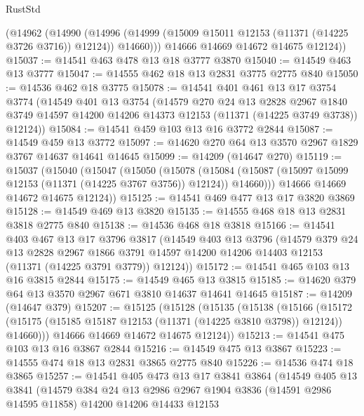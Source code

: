 \begin{lexlean}{RustStd}
\begin{coremodule}
        (@14962
          (@14990
            (@14996 (@14999 (@15009 @15011 @12153 (@11371 (@14225 @3726 @3716)) @12124)) @14660)))
        @14666
        @14669
        @14672
        @14675
        @12124))
@15037 := @14541 @463 @478 @13 @18 @3777 @3870
@15040 := @14549 @463 @13 @3777
@15047 := @14555 @462 @18 @13 @2831 @3775 @2775 @840
@15050 := @14536 @462 @18 @3775
@15078 := @14541
    @401
    @461
    @13
    @17
    @3754
    @3774
    (@14549
      @401
      @13
      @3754
      (@14579
        @270
        @24
        @13
        @2828
        @2967
        @1840
        @3749
        @14597
        @14200
        @14206
        @14373
        @12153
        (@11371 (@14225 @3749 @3738))
        @12124))
@15084 := @14541 @459 @103 @13 @16 @3772 @2844
@15087 := @14549 @459 @13 @3772
@15097 := @14620 @270 @64 @13 @3570 @2967 @1829 @3767 @14637 @14641 @14645
@15099 := @14209 (@14647 @270)
@15119 := @15037
    (@15040
      (@15047
        (@15050
          (@15078
            (@15084 (@15087 (@15097 @15099 @12153 (@11371 (@14225 @3767 @3756)) @12124)) @14660)))
        @14666
        @14669
        @14672
        @14675
        @12124))
@15125 := @14541 @469 @477 @13 @17 @3820 @3869
@15128 := @14549 @469 @13 @3820
@15135 := @14555 @468 @18 @13 @2831 @3818 @2775 @840
@15138 := @14536 @468 @18 @3818
@15166 := @14541
    @403
    @467
    @13
    @17
    @3796
    @3817
    (@14549
      @403
      @13
      @3796
      (@14579
        @379
        @24
        @13
        @2828
        @2967
        @1866
        @3791
        @14597
        @14200
        @14206
        @14403
        @12153
        (@11371 (@14225 @3791 @3779))
        @12124))
@15172 := @14541 @465 @103 @13 @16 @3815 @2844
@15175 := @14549 @465 @13 @3815
@15185 := @14620 @379 @64 @13 @3570 @2967 @671 @3810 @14637 @14641 @14645
@15187 := @14209 (@14647 @379)
@15207 := @15125
    (@15128
      (@15135
        (@15138
          (@15166
            (@15172 (@15175 (@15185 @15187 @12153 (@11371 (@14225 @3810 @3798)) @12124)) @14660)))
        @14666
        @14669
        @14672
        @14675
        @12124))
@15213 := @14541 @475 @103 @13 @16 @3867 @2844
@15216 := @14549 @475 @13 @3867
@15223 := @14555 @474 @18 @13 @2831 @3865 @2775 @840
@15226 := @14536 @474 @18 @3865
@15257 := @14541
    @405
    @473
    @13
    @17
    @3841
    @3864
    (@14549
      @405
      @13
      @3841
      (@14579
        @384
        @24
        @13
        @2986
        @2967
        @1904
        @3836
        (@14591 @2986 @14595 @11858)
        @14200
        @14206
        @14433
        @12153

\end{coremodule}
\end{lexlean}
